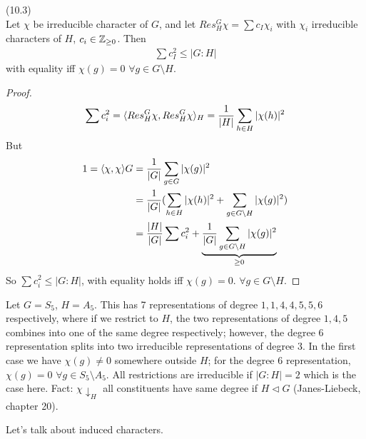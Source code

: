 \documentclass[a4paper]{article}
\begin{document}
\begin{lemma} (10.3)\\
Let $\chi$ be irreducible character of $G$, and let $Res_H^G \chi = \sum c_I \chi_i$ with $\chi_i$ irreducible characters of $H$, $c_i \in \mathbb{Z}_{\geq 0}$. Then
\begin{equation*}
\begin{aligned}
\sum c_I^2 \leq |G:H|
\end{aligned}
\end{equation*}
with equality iff $\chi(g) = 0$ $\forall g \in G \setminus H$.
\begin{proof}
\begin{equation*}
\begin{aligned}
\sum c_i^2 = \langle Res_H^G \chi,Res_H^G \chi \rangle_H = \frac{1}{|H|} \sum_{h \in H} |\chi(h)|^2
\end{aligned}
\end{equation*}
But 
\begin{equation*}
\begin{aligned}
1 = \langle \chi,\chi\rangle G &= \frac{1}{|G|} \sum_{g \in G} |\chi(g)|^2\\
&= \frac{1}{|G|} (\sum_{h \in H} |\chi(h)|^2 + \sum_{g \in G \setminus H} |\chi(g)|^2)\\
&= \frac{|H|}{|G|} \sum c_i^2 + \underbrace{\frac{1}{|G|} \sum_{g \in G \setminus H} |\chi(g)|^2}_{\geq 0}
\end{aligned}
\end{equation*}
So $\sum c_i^2 \leq |G:H|$, with equality holds iff $\chi(g) = 0$. $\forall g \in G\setminus H$.
\end{proof}
\end{lemma}

\begin{eg}
Let $G=S_5$, $H=A_5$. This has 7 representations of degree $1,1,4,4,5,5,6$ respectively, where if we restrict to $H$, the two representations of degree $1,4,5$ combines into one of the same degree respectively; however, the degree $6$ representation splits into two irreducible representations of degree 3. In the first case we have $\chi(g) \neq 0$ somewhere outside $H$; for the degree $6$ representation, $\chi(g) = 0$ $\forall g \in S_5 \setminus A_5$. All restrictions are irreducible if $|G:H|=2$ which is the case here. Fact: $\chi \downarrow_H$ all constituents have same degree if $H \triangleleft G$ (Janes-Liebeck, chapter 20).
\end{eg}

Let's talk about induced characters.
\end{document}
